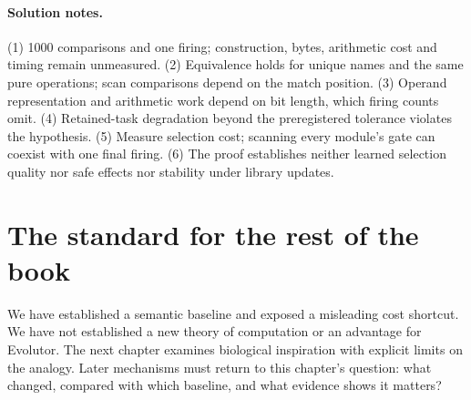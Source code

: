 \paragraph{Solution notes.}
(1) 1000 comparisons and one firing; construction, bytes, arithmetic cost and
timing remain unmeasured. (2) Equivalence holds for unique names and the same
pure operations; scan comparisons depend on the match position. (3) Operand
representation and arithmetic work depend on bit length, which firing counts
omit. (4) Retained-task degradation beyond the preregistered tolerance violates
the hypothesis. (5) Measure selection cost; scanning every module's gate can
coexist with one final firing. (6) The proof establishes neither learned
selection quality nor safe effects nor stability under library updates.

\section*{The standard for the rest of the book}
We have established a semantic baseline and exposed a misleading cost shortcut.
We have not established a new theory of computation or an advantage for
Evolutor. The next chapter examines biological inspiration with explicit
limits on the analogy. Later mechanisms must return to this chapter's question:
what changed, compared with which baseline, and what evidence shows it matters?

